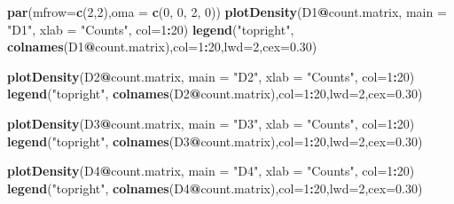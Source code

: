\documentclass[]{article}
\newenvironment{Shaded}{\begin{snugshade}}{\end{snugshade}}
\newcommand{\DataTypeTok}[1]{\textcolor[rgb]{0.13,0.29,0.53}{#1}}
\newcommand{\DecValTok}[1]{\textcolor[rgb]{0.00,0.00,0.81}{#1}}
\newcommand{\FloatTok}[1]{\textcolor[rgb]{0.00,0.00,0.81}{#1}}
\newcommand{\KeywordTok}[1]{\textcolor[rgb]{0.13,0.29,0.53}{\textbf{#1}}}
\newcommand{\NormalTok}[1]{#1}
\newcommand{\OperatorTok}[1]{\textcolor[rgb]{0.81,0.36,0.00}{\textbf{#1}}}
\newcommand{\StringTok}[1]{\textcolor[rgb]{0.31,0.60,0.02}{#1}}
\begin{document}
\begin{Shaded}
\begin{Highlighting}[]
\KeywordTok{par}\NormalTok{(}\DataTypeTok{mfrow=}\KeywordTok{c}\NormalTok{(}\DecValTok{2}\NormalTok{,}\DecValTok{2}\NormalTok{),}\DataTypeTok{oma =} \KeywordTok{c}\NormalTok{(}\DecValTok{0}\NormalTok{, }\DecValTok{0}\NormalTok{, }\DecValTok{2}\NormalTok{, }\DecValTok{0}\NormalTok{))}
\KeywordTok{plotDensity}\NormalTok{(D1}\OperatorTok{@}\NormalTok{count.matrix, }\DataTypeTok{main =} \StringTok{"D1"}\NormalTok{, }\DataTypeTok{xlab =} \StringTok{"Counts"}\NormalTok{, }\DataTypeTok{col=}\DecValTok{1}\OperatorTok{:}\DecValTok{20}\NormalTok{)}
\KeywordTok{legend}\NormalTok{(}\StringTok{"topright"}\NormalTok{, }\KeywordTok{colnames}\NormalTok{(D1}\OperatorTok{@}\NormalTok{count.matrix),}\DataTypeTok{col=}\DecValTok{1}\OperatorTok{:}\DecValTok{20}\NormalTok{,}\DataTypeTok{lwd=}\DecValTok{2}\NormalTok{,}\DataTypeTok{cex=}\FloatTok{0.30}\NormalTok{)}

\KeywordTok{plotDensity}\NormalTok{(D2}\OperatorTok{@}\NormalTok{count.matrix, }\DataTypeTok{main =} \StringTok{"D2"}\NormalTok{, }\DataTypeTok{xlab =} \StringTok{"Counts"}\NormalTok{, }\DataTypeTok{col=}\DecValTok{1}\OperatorTok{:}\DecValTok{20}\NormalTok{)}
\KeywordTok{legend}\NormalTok{(}\StringTok{"topright"}\NormalTok{, }\KeywordTok{colnames}\NormalTok{(D2}\OperatorTok{@}\NormalTok{count.matrix),}\DataTypeTok{col=}\DecValTok{1}\OperatorTok{:}\DecValTok{20}\NormalTok{,}\DataTypeTok{lwd=}\DecValTok{2}\NormalTok{,}\DataTypeTok{cex=}\FloatTok{0.30}\NormalTok{)}

\KeywordTok{plotDensity}\NormalTok{(D3}\OperatorTok{@}\NormalTok{count.matrix, }\DataTypeTok{main =} \StringTok{"D3"}\NormalTok{, }\DataTypeTok{xlab =} \StringTok{"Counts"}\NormalTok{, }\DataTypeTok{col=}\DecValTok{1}\OperatorTok{:}\DecValTok{20}\NormalTok{)}
\KeywordTok{legend}\NormalTok{(}\StringTok{"topright"}\NormalTok{, }\KeywordTok{colnames}\NormalTok{(D3}\OperatorTok{@}\NormalTok{count.matrix),}\DataTypeTok{col=}\DecValTok{1}\OperatorTok{:}\DecValTok{20}\NormalTok{,}\DataTypeTok{lwd=}\DecValTok{2}\NormalTok{,}\DataTypeTok{cex=}\FloatTok{0.30}\NormalTok{)}


\KeywordTok{plotDensity}\NormalTok{(D4}\OperatorTok{@}\NormalTok{count.matrix, }\DataTypeTok{main =} \StringTok{"D4"}\NormalTok{, }\DataTypeTok{xlab =} \StringTok{"Counts"}\NormalTok{, }\DataTypeTok{col=}\DecValTok{1}\OperatorTok{:}\DecValTok{20}\NormalTok{)}
\KeywordTok{legend}\NormalTok{(}\StringTok{"topright"}\NormalTok{, }\KeywordTok{colnames}\NormalTok{(D4}\OperatorTok{@}\NormalTok{count.matrix),}\DataTypeTok{col=}\DecValTok{1}\OperatorTok{:}\DecValTok{20}\NormalTok{,}\DataTypeTok{lwd=}\DecValTok{2}\NormalTok{,}\DataTypeTok{cex=}\FloatTok{0.30}\NormalTok{)}
\end{Highlighting}
\end{Shaded}
\end{document}
